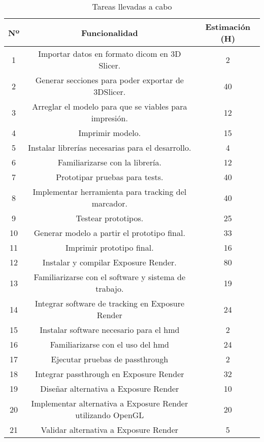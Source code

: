 \begin{table}
  \centering
  \begin{tabular}{c|c|c}
  \rowcolor{udcpink!25}
  \textbf{Nº} & \textbf{Funcionalidad}& \textbf{Estimación (H)} \\\hline
  1     &   Importar datos en formato \acrshort{dicom} en 3D Slicer.    &   2     \\
  2     &   Generar secciones para poder exportar de 3DSlicer.          &   40    \\
  3     &   Arreglar el modelo para que se viables para impresión.      &   12    \\
  4     &   Imprimir modelo.                                            &   15    \\
  5     &   Instalar librerías necesarias para el desarrollo.           &   4     \\
  6     &   Familiarizarse con la librería.                             &   12    \\
  7     &   Prototipar pruebas para tests.                              &   40    \\
  8     &   Implementar herramienta para tracking del marcador.         &   40    \\  
  9     &   Testear prototipos.                                         &   25    \\
  10    &   Generar modelo a partir el prototipo final.                 &   33    \\
  11    &   Imprimir prototipo final.                                   &   16    \\
  12    &   Instalar y compilar Exposure Render.                        &   80    \\
  13    &   Familiarizarse con el software y sistema de trabajo.        &   19    \\
  14    &   Integrar software de tracking en Exposure Render            &   24    \\
  15    &   Instalar software necesario para el \acrshort{hmd}          &   2     \\
  16    &   Familiarizarse con el uso del \acrshort{hmd}                &   24    \\
  17    &   Ejecutar pruebas de passthrough                             &   2     \\
  18    &   Integrar passthrough en Exposure Render                     &   32    \\
  19    &   Diseñar alternativa a Exposure Render                       &   10    \\
  20    &   Implementar alternativa a Exposure Render utilizando OpenGL &   20    \\
  21    &   Validar alternativa a Exposure Render                       &   5    \\
  \end{tabular}
  \caption{Tareas llevadas a cabo}
  \label{tab:tareas}
\end{table}

